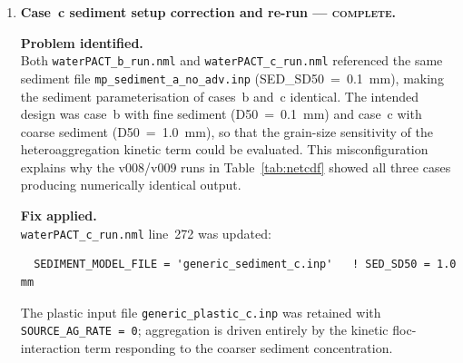 \documentclass[11pt]{article}
\begin{document}
\begin{enumerate}
\paragraph{Verdict: the Memo~03 problem is \textbf{fully solved};\break
sediment \texttt{adv\_scal} is safe.}

\begin{itemize}
  \item With Fix~B+ active in all three cases (v008), case~a reaches
        exactly the same final mass as cases~b and~c (1001.3~kg at day~10),
        confirming that the $\sim\!650$~kg gap was caused entirely by the
        NaN$\to$neg-clamp mass-destruction pathway.
  \item v009 adds \texttt{adv\_scal} back for sediment while keeping
        \texttt{adv\_scal\_backward} and \texttt{fct\_sed} disabled.
        All three cases still reach 1001.3~kg with zero case-to-case gap,
        proving that \texttt{adv\_scal} does not interfere with MP transport.
  \item The guilty operator was therefore \textbf{\texttt{adv\_scal\_backward}}
        (the Ge backward-difference scheme) and/or \texttt{fct\_sed}, both of
        which write to shared scalar-gradient arrays (\texttt{PFPXB}/\texttt{PFPYB})
        in a way that corrupts subsequent MP advection calls.
  \item The \texttt{split\_sum $-$ mp1} diagnostic is identically zero for
        both cases~b and~c in v008 and v009, confirming that the
        \texttt{PLAST\_FLOC} split path conserves mass internally.
\end{itemize}

\item \textbf{Case~c sediment setup correction and re-run ---
  \textsc{complete}.} \checkmark

\textbf{Problem identified.}\\
Both \texttt{waterPACT\_b\_run.nml} and \texttt{waterPACT\_c\_run.nml}
referenced the same sediment file \texttt{mp\_sediment\_a\_no\_adv.inp}
(SED\_SD50~=~0.1~mm), making the sediment parameterisation of cases~b and~c
identical.  The intended design was case~b with fine sediment (D50~=~0.1~mm)
and case~c with coarse sediment (D50~=~1.0~mm), so that the grain-size
sensitivity of the heteroaggregation kinetic term could be evaluated.
This misconfiguration explains why the v008/v009 runs in Table~\ref{tab:netcdf}
showed all three cases producing numerically identical output.

\textbf{Fix applied.}\\
\texttt{waterPACT\_c\_run.nml} line~272 was updated:
\begin{verbatim}
  SEDIMENT_MODEL_FILE = 'generic_sediment_c.inp'   ! SED_SD50 = 1.0 mm
\end{verbatim}
The plastic input file \texttt{generic\_plastic\_c.inp} was retained with
\texttt{SOURCE\_AG\_RATE~=~0}; aggregation is driven entirely by the kinetic
floc-interaction term responding to the coarser sediment concentration.


\end{enumerate}
\end{document}
